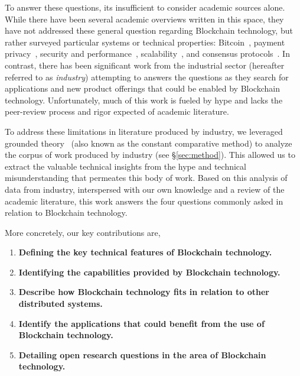 To answer these questions, its insufficient to consider academic sources alone.
While there have been several academic overviews written in this space, they have not addressed these general question regarding Blockchain technology, but rather surveyed particular systems or technical properties: Bitcoin~\cite{BMC+15,Narayanan17}, payment privacy~\cite{Conti17}, security and performance~\cite{Gervais16}, scalability~\cite{Croman16}, and consensus protocols~\cite{Bano17,garay2018consensus}.
In contrast, there has been significant work from the industrial sector (hereafter referred to as \emph{industry}) attempting to answers the questions as they search for applications and new product offerings that could be enabled by Blockchain technology.
Unfortunately, much of this work is fueled by hype and lacks the peer-review process and rigor expected of academic literature.

To address these limitations in literature produced by industry, we leveraged grounded theory~\cite{glaser1965constant,strauss1990basics,corbin1990grounded} (also known as the constant comparative method) to analyze the corpus of work produced by industry (see \S\ref{sec:method}).
This allowed us to extract the valuable technical insights from the hype and technical misunderstanding that permeates this body of work.
Based on this analysis of data from industry, interspersed with our own knowledge and a review of the academic literature, this work answers the four questions commonly asked in relation to Blockchain technology.

More concretely, our key contributions are,

\begin{enumerate}
	\item \textbf{Defining the key technical features of Blockchain technology.}
		
	\item \textbf{Identifying the capabilities provided by Blockchain technology.}
		
	\item \textbf{Describe how Blockchain technology fits in relation to other distributed systems.}
	
	\item \textbf{Identify the applications that could benefit from the use of Blockchain technology.}
	
	\item \textbf{Detailing open research questions in the area of Blockchain technology.}
	
\end{enumerate}
